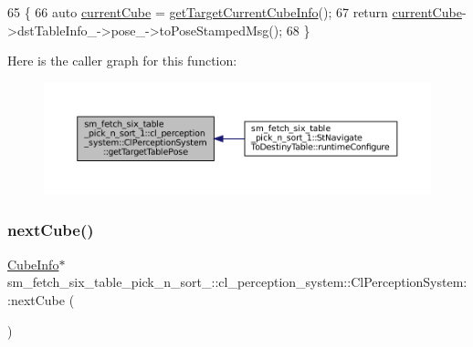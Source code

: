 \begin{DoxyCode}
65             \{
66                 \textcolor{keyword}{auto} \hyperlink{classsm__fetch__six__table__pick__n__sort__1_1_1cl__perception__system_1_1ClPerceptionSystem_abdaef89ff802e4e855073c1f2469f03c}{currentCube} = \hyperlink{classsm__fetch__six__table__pick__n__sort__1_1_1cl__perception__system_1_1ClPerceptionSystem_a4103ba8479b122c7af34b3b51102c5d5}{getTargetCurrentCubeInfo}();
67                 \textcolor{keywordflow}{return} \hyperlink{classsm__fetch__six__table__pick__n__sort__1_1_1cl__perception__system_1_1ClPerceptionSystem_abdaef89ff802e4e855073c1f2469f03c}{currentCube}->dstTableInfo\_->pose\_->toPoseStampedMsg();
68             \}
\end{DoxyCode}
Here is the caller graph for this function\+:
\nopagebreak
\begin{figure}[H]
\begin{center}
\leavevmode
\includegraphics[width=350pt]{classsm__fetch__six__table__pick__n__sort__1_1_1cl__perception__system_1_1ClPerceptionSystem_a61edffc5d1c6332a211324a328f1ba19_icgraph}
\end{center}
\end{figure}
\mbox{\label{classsm__fetch__six__table__pick__n__sort__1_1_1cl__perception__system_1_1ClPerceptionSystem_a5df76b1b2bd090465ac2adf6f7c059d3}} 
\subsubsection{\texorpdfstring{next\+Cube()}{nextCube()}}
{\footnotesize\ttfamily \hyperlink{structsm__fetch__six__table__pick__n__sort__1_1_1cl__perception__system_1_1CubeInfo}{Cube\+Info}$\ast$ sm\+\_\+fetch\+\_\+six\+\_\+table\+\_\+pick\+\_\+n\+\_\+sort\+\_\+::cl\+\_\+perception\+\_\+system\+::\+Cl\+Perception\+System\+::next\+Cube (\begin{DoxyParamCaption}{ }\end{DoxyParamCaption})\hspace{0.3cm}{\ttfamily [inline]}}



